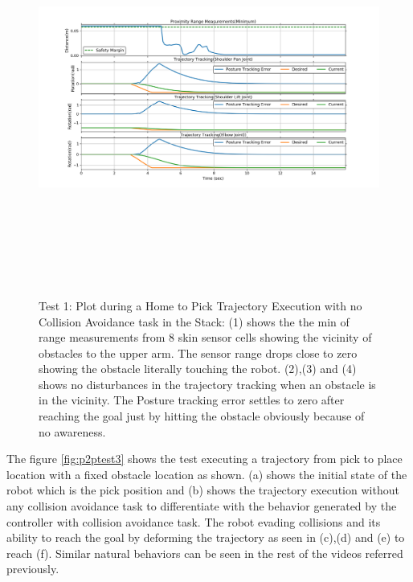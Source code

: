 \begin{figure}[H]
\centering
\includegraphics[width=18cm,height=13cm,center]{chapters/doa/images/delft/test_home2pick/plot_0_nocollision.png}
\caption{Test 1: Plot during a Home to Pick Trajectory Execution with no Collision Avoidance task in the Stack: (1) shows the the min of range measurements from 8 skin sensor cells showing the vicinity of obstacles to the upper arm. The sensor range drops close to zero showing the obstacle literally touching the robot. (2),(3) and (4) shows no disturbances in the trajectory tracking when an obstacle is in the vicinity. The Posture tracking error settles to zero after reaching the goal just by hitting the obstacle obviously because of no awareness.}
\label{Home2Pick:nocollision}
\end{figure}

The figure \ref{fig:p2ptest3} shows the test executing a trajectory from pick to place location with a fixed obstacle location as shown. (a) shows the initial state of the robot which is the pick position and (b) shows the trajectory execution without any collision avoidance task to differentiate with the behavior generated by the controller with collision avoidance task. The robot evading collisions and its ability to reach the goal by deforming the trajectory as seen in (c),(d) and (e) to reach (f). Similar natural behaviors can be seen in the rest of the videos referred previously.

